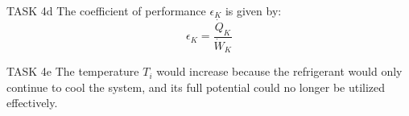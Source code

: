 TASK 4d  
The coefficient of performance \( \epsilon_K \) is given by:  
\[
\epsilon_K = \frac{\dot{Q}_K}{\dot{W}_K}
\]

TASK 4e  
The temperature \( T_i \) would increase because the refrigerant would only continue to cool the system, and its full potential could no longer be utilized effectively.